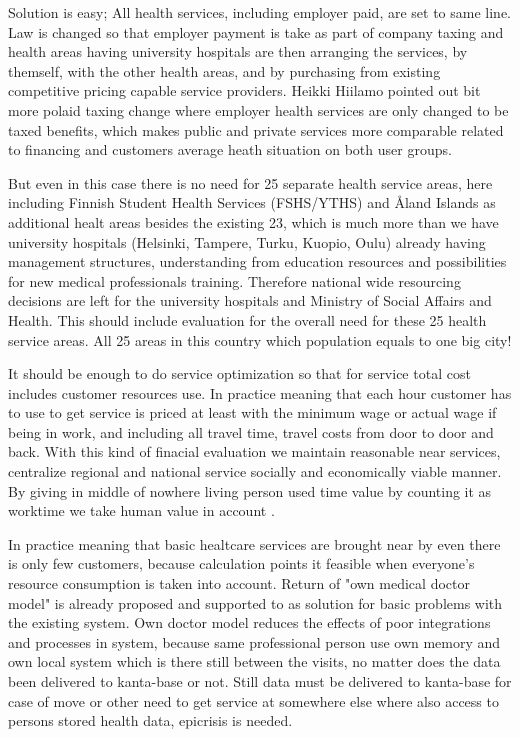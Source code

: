 Solution is easy; All health services, including employer paid, are set to
same line. Law is changed so that employer payment is take as part of company
taxing and health areas having university hospitals are then arranging the
services, by themself, with the other health areas, and by purchasing from
existing competitive pricing capable service providers. Heikki Hiilamo
pointed out bit more polaid taxing change\cite{YleAtalk202412122106} where
employer health services are only changed to be taxed benefits, which makes
public and private services more comparable related to financing and customers
average heath situation on both user groups.

But even in this case
there is no need for 25 separate health service areas, here including Finnish
Student Health Services (FSHS/YTHS) and Åland Islands as additional healt
areas besides the existing 23, which is much more than we have university
hospitals (Helsinki, Tampere, Turku, Kuopio, Oulu) already having management
structures, understanding from education resources and possibilities for
new medical professionals training. Therefore national wide resourcing
decisions are left for the university hospitals and Ministry of Social
Affairs and Health. This should include evaluation for the overall need for
these 25 health service areas. All 25 areas in this country which population
equals to one big city!

It should be enough to do service optimization so that for service total cost
includes customer resources use. In practice meaning that each hour customer
has to use to get service is priced at least with the minimum wage or actual
wage if being in work, and including all travel time, travel costs from door
to door and back. With this kind of finacial evaluation we maintain reasonable
near services, centralize regional and national service socially and
economically viable manner. By giving in middle of nowhere living person used
time value by counting it as worktime we take human value in account
\cite{Yle202411251731}.

In practice meaning that basic healtcare services are brought near by even
there is only few customers, because calculation points it feasible when
everyone's resource consumption is taken into account. Return of "own medical
doctor model" is already
proposed\cite{Yle202410222121}\cite{YleAstudio202410292107} and
supported\cite{Yle202411191722} to as solution for basic problems with the
existing system. Own doctor model reduces the effects of poor integrations and
processes in system, because same professional person use own memory and own
local system which is there still between the visits, no matter does the data
been delivered to kanta-base or not. Still data must be delivered to
kanta-base for case of move or other need to get service at somewhere else
where also access to persons stored health data, epicrisis is needed.

